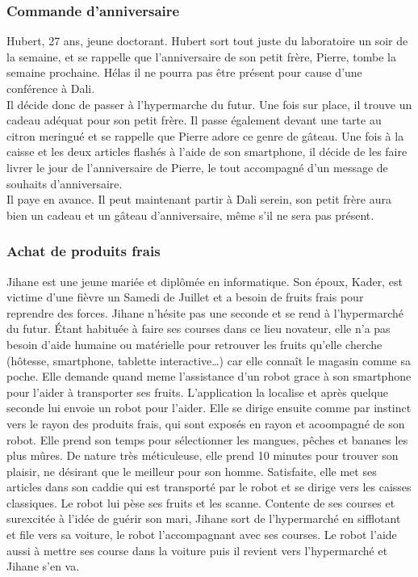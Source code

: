 				\subsubsection{Commande d'anniversaire}
					Hubert, 27 ans, jeune doctorant. Hubert sort tout juste du laboratoire un soir de la semaine, et se rappelle que l'anniversaire de son petit frère, Pierre, tombe la semaine prochaine. Hélas il ne pourra pas être présent pour cause d'une conférence à Dali.\\
					Il décide donc de passer à l'\gls{hypermarche} du futur. Une fois sur place, il trouve un cadeau adéquat pour son petit frère. Il passe également devant une tarte au citron meringué et se rappelle que Pierre adore ce genre de gâteau. Une fois à la caisse et les deux articles flashés à l'aide de son \gls{smartphone}, il décide de les faire livrer le jour de l'anniversaire de Pierre, le tout accompagné d'un message de souhaits d'anniversaire.\\
					Il paye en avance. Il peut maintenant partir à Dali serein, son petit frère aura bien un cadeau et un gâteau d'anniversaire, même s'il ne sera pas présent.
				\subsubsection{Achat de produits frais}
					Jihane est une jeune mariée et diplômée en informatique. Son époux, Kader, est victime d’une fièvre un Samedi de Juillet et a besoin de fruits frais pour reprendre des forces. Jihane n’hésite pas une seconde et se rend à l’hypermarché du futur.  Étant habituée à faire ses courses dans ce lieu novateur, elle n’a pas besoin d’aide humaine ou matérielle pour retrouver les fruits qu’elle cherche (hôtesse, smartphone, tablette interactive…) car elle connaît le magasin comme sa poche. Elle demande quand meme l’assistance d’un robot grace à son smartphone pour l’aider à transporter ses fruits. L’application la localise et après quelque seconde lui envoie un robot pour l’aider. Elle se dirige ensuite comme par instinct vers le rayon des produits frais, qui sont exposés en rayon et acoompagné de son robot. Elle prend son temps pour sélectionner les mangues, pêches et bananes les plus mûres. De nature très méticuleuse, elle prend 10 minutes pour trouver son plaisir, ne désirant que le meilleur pour son homme. Satisfaite, elle met ses articles dans son caddie qui est transporté par le robot et se dirige vers les caisses classiques. Le robot lui pèse ses fruits et les scanne. Contente de ses courses et surexcitée à l’idée de guérir son mari, Jihane sort de l’hypermarché en sifflotant et file vers sa voiture, le robot l’accompagnant avec ses courses. Le robot l’aide aussi à mettre ses course dans la voiture puis il revient vers l’hypermarché et Jihane s’en va.
